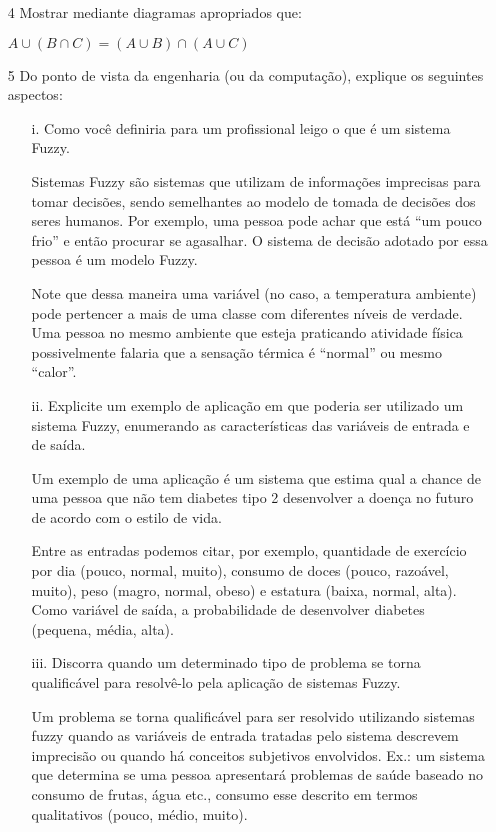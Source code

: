\documentclass{report}
\begin{document}
\begin{enumerate}
\begin{enumerate}
\end{enumerate}


\item[4] Mostrar mediante diagramas apropriados que:

$A \cup (B \cap C) = (A \cup B) \cap (A \cup C)$

\item[5] Do ponto de vista da engenharia (ou da computação), explique os seguintes aspectos:

\begin{enumerate}
\item[i.] Como você definiria para um profissional leigo o que é um sistema Fuzzy.

Sistemas Fuzzy são sistemas que utilizam de informações imprecisas para tomar decisões, sendo semelhantes 
ao modelo de tomada de decisões dos seres humanos. Por exemplo, uma pessoa pode achar que está ``um pouco
frio'' e então procurar se agasalhar. O sistema de decisão adotado por essa pessoa é um modelo Fuzzy. 

Note que dessa maneira uma variável (no caso, a temperatura ambiente) 
pode pertencer a mais de uma classe com diferentes níveis de verdade. Uma pessoa no
mesmo ambiente que esteja praticando atividade física possivelmente falaria que a sensação térmica é ``normal'' ou mesmo
``calor''.

\item[ii.] Explicite um exemplo de aplicação em que poderia ser utilizado um sistema Fuzzy, 
enumerando as características das variáveis de entrada e de saída.

Um exemplo de uma aplicação é um sistema que estima qual a chance de uma pessoa que não tem diabetes tipo 2
desenvolver a doença no futuro de acordo com o estilo de vida. 

Entre as entradas podemos citar, por exemplo, quantidade 
de exercício por dia (pouco, normal, muito), consumo de doces (pouco, razoável, muito), peso (magro, normal, obeso) e 
estatura (baixa, normal, alta).  Como variável de saída, a probabilidade de desenvolver diabetes (pequena, média, alta).

\item[iii.] Discorra quando um determinado tipo de problema se torna qualificável para 
resolvê-lo pela aplicação de sistemas Fuzzy.

Um problema se torna qualificável para ser resolvido utilizando sistemas fuzzy quando as variáveis de entrada tratadas pelo sistema
descrevem imprecisão ou quando há conceitos subjetivos envolvidos. Ex.: um sistema que determina se uma pessoa apresentará problemas
de saúde baseado no consumo de frutas, água etc., consumo esse descrito em termos qualitativos (pouco, médio, muito).


\end{enumerate}
\end{enumerate}
\end{document}
